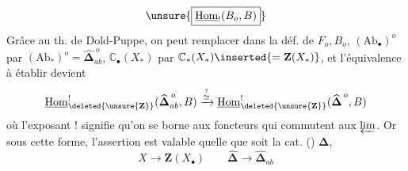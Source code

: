 \[
\unsure{\boxed{\underline{\operatorname{Hom}}_!(B_o,B)}}
\]
Grâce au th. de Dold-Puppe, on peut
remplacer dans la déf. de
$F_o,B_o$, $(\mathrm{Ab}_\bullet)^o$ par $(\mathrm{Ab}_*)^o=\widehat{\boldsymbol\Delta}_{ab}^{\,o}$,
$\mathbb C_\bullet(X_*)$ par $\mathbb C_*(X_*)\inserted{=\mathbf Z(X_*)}$, et l'équivalence à établir
devient
\[
\underline{\operatorname{Hom}}^{!}_{\deleted{\unsure{\mathbf Z}}}
(\widehat{\boldsymbol\Delta}_{ab}^{\,o},B)
\xrightarrow{\overset{?}{\simeq}}
\underline{\operatorname{Hom}}^{!}_{\deleted{\unsure{\mathbf Z}}}(\widehat{\boldsymbol\Delta}^{\,o},B)
\]
où l'exposant ! signifie qu'on se borne
aux foncteurs qui commutent aux $\varprojlim$.
Or sous cette forme, l'assertion est
valable quelle que soit la cat. ()
$\boldsymbol\Delta$, 
\[
X\longrightarrow\mathbf Z(X_\bullet)\qquad
\widehat{\boldsymbol\Delta}\longrightarrow\widehat{\boldsymbol\Delta}_{ab}
\]
